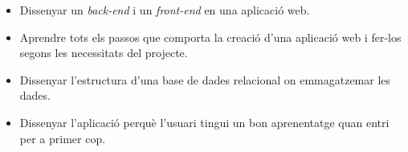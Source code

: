 \begin{slide}
    \begin{itemize}
        \item Dissenyar un \emph{back-end} i un \emph{front-end} en una aplicació web.
        \item Aprendre tots els passos que comporta la creació d'una aplicació web i fer-los segons les necessitats del projecte.
        \item Dissenyar l'estructura d'una base de dades relacional on emmagatzemar les dades.
        \item Dissenyar l'aplicació perquè l'usuari tingui un bon aprenentatge quan entri per a primer cop.
    \end{itemize}
\end{slide}